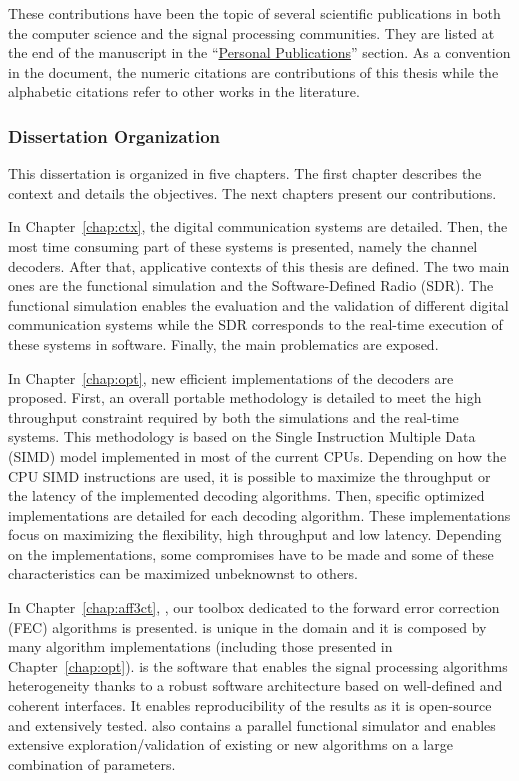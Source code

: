 These contributions have been the topic of several scientific publications in
both the computer science and the signal processing communities. They are listed
at the end of the manuscript in the
``\hyperref[chap:publi]{Personal Publications}'' section. As a convention in the
document, the numeric citations are contributions of this thesis while the
alphabetic citations refer to other works in the literature.

\subsubsection*{Dissertation Organization}

This dissertation is organized in five chapters. The first chapter describes the
context and details the objectives. The next chapters present our contributions.

In Chapter~\ref{chap:ctx}, the digital communication systems are detailed. Then,
the most time consuming part of these systems is presented, namely the channel
decoders. After that, applicative contexts of this thesis are defined. The two
main ones are the functional simulation and the Software-Defined Radio (SDR).
The functional simulation enables the evaluation and the validation of different
digital communication systems while the SDR corresponds to the real-time
execution of these systems in software. Finally, the main problematics are
exposed.

In Chapter~\ref{chap:opt}, new efficient implementations of the decoders are
proposed. First, an overall portable methodology is detailed to meet the high
throughput constraint required by both the simulations and the real-time
systems. This methodology is based on the Single Instruction Multiple Data
(SIMD) model implemented in most of the current CPUs. Depending on how the CPU
SIMD instructions are used, it is possible to maximize the throughput or the
latency of the implemented decoding algorithms. Then, specific optimized
implementations are detailed for each decoding algorithm. These implementations
focus on maximizing the flexibility, high throughput and low latency. Depending
on the implementations, some compromises have to be made and some of these
characteristics can be maximized unbeknownst to others.

In Chapter~\ref{chap:aff3ct}, \AFFECT, our toolbox dedicated to the forward
error correction (FEC) algorithms is presented. \AFFECT is unique in the domain
and it is composed by many algorithm implementations (including those presented
in Chapter~\ref{chap:opt}). \AFFECT is the software that enables the signal
processing algorithms heterogeneity thanks to a robust software architecture
based on well-defined and coherent interfaces. It enables reproducibility of the
results as it is open-source and extensively tested. \AFFECT also contains a
parallel functional simulator and enables extensive exploration/validation of
existing or new algorithms on a large combination of parameters.

